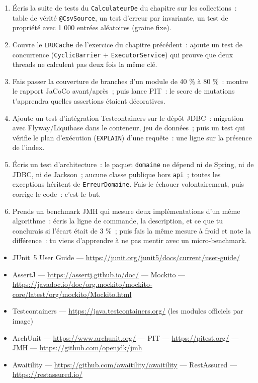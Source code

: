 \begin{exercice}
\begin{enumerate}
  \item \'Ecris la suite de tests du \verb|CalculateurDe| du chapitre sur les collections~: table de
        v\'erit\'e \verb|@CsvSource|, un test d'erreur par invariante, un test de propri\'et\'e avec 1 000
        entr\'ees al\'eatoires (graine fixe).
  \item Couvre le \verb|LRUCache| de l'exercice du chapitre pr\'ec\'edent~: ajoute un test de
        concurrence (\verb|CyclicBarrier| + \verb|ExecutorService|) qui prouve que deux threads
        ne calculent pas deux fois la m\^eme cl\'e.
  \item Fais passer la couverture de branches d'un module de 40 \% \`a 80 \%~: montre le rapport
        JaCoCo avant/apr\`es~; puis lance PIT~: le score de mutations t'apprendra quelles assertions
        \'etaient d\'ecoratives.
  \item Ajoute un test d'int\'egration Testcontainers sur le d\'ep\^ot JDBC~: migration avec Flyway/Liquibase
        dans le conteneur, jeu de donn\'ees~; puis un test qui v\'erifie le plan d'ex\'ecution
        (\verb|EXPLAIN|) d'une requ\^ete~: une ligne sur la pr\'esence de l'index.
  \item \'Ecris un test d'architecture~: le paquet \verb|domaine| ne d\'epend ni de Spring, ni de JDBC,
        ni de Jackson~; aucune classe publique hors \verb|api|~; toutes les exceptions h\'eritent de
        \verb|ErreurDomaine|. Fais-le \'echouer volontairement, puis corrige le code~: c'est le but.
  \item Prends un benchmark JMH qui mesure deux impl\'ementations d'un m\^eme algorithme~:
        \'ecris la ligne de commande, la description, et ce que tu conclurais si l'\'ecart \'etait de
        3 \%~; puis fais la m\^eme mesure \`a froid et note la diff\'erence~: tu viens d'apprendre \`a ne
        pas mentir avec un micro-benchmark.
\end{enumerate}
\end{exercice}

\begin{ressources}
\begin{itemize}
  \item JUnit~5 User Guide --- \url{https://junit.org/junit5/docs/current/user-guide/}
  \item AssertJ --- \url{https://assertj.github.io/doc/} --- Mockito --- \url{https://javadoc.io/doc/org.mockito/mockito-core/latest/org/mockito/Mockito.html}
  \item Testcontainers --- \url{https://java.testcontainers.org/} (les modules officiels par image)
  \item ArchUnit --- \url{https://www.archunit.org/} --- PIT --- \url{https://pitest.org/} --- JMH --- \url{https://github.com/openjdk/jmh}
  \item Awaitility --- \url{https://github.com/awaitility/awaitility} --- RestAssured --- \url{https://restassured.io/}
\end{itemize}
\end{ressources}

